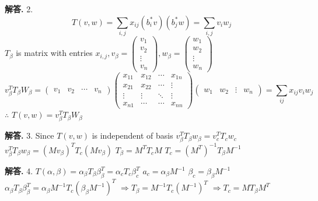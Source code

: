 \documentclass[12pt, a4paper, oneside]{article}
\newenvironment{solution}{\par\noindent\textbf{解答. }}{\par}
\begin{document}
\begin{CJK}{UTF8}{gbsn}
\begin{solution} 2. \newline 
  $$T(v,w) = \sum_{i,j}x_{ij}\left( b^*_iv \right)\left( b^*_j w\right) = \sum_{i,j}v_iw_j$$
  $T_\beta$ is matrix with entries $x_{i,j}, v_\beta=\begin{pmatrix}
    v_1 \\ v_2 \\ \vdots \\ v_n
  \end{pmatrix}, w_\beta = \begin{pmatrix}
    w_1 \\ w_2 \\ \vdots \\ w_n
  \end{pmatrix}$
  $$ v_\beta^T T_\beta W_\beta = \begin{pmatrix}
    v_1 & v_2 & \cdots & v_n
  \end{pmatrix}\begin{pmatrix}
    x_{11} & x_{12} & \cdots & x_{1n} \\
    x_{21} & x_{22} & \cdots & \vdots \\
    \vdots & \vdots & \ddots & \vdots \\
    x_{n1} & \cdots & \cdots & x_{nn}
  \end{pmatrix}\begin{pmatrix}
    w_1 & w_2 & \vdots & w_n
  \end{pmatrix} = \sum_{ij}x_{ij}v_iw_j$$
  $\therefore$ $T(v,w) = v^T_\beta T_\beta W_\beta$
\end{solution}

\begin{solution} 3. \newline
  Since $T(v,w)$ is independent of basis \newline
  $v_\beta^TT_\beta w_\beta = v_c^T T_c w_c$ \newline
  $v_\beta^TT_\beta w_\beta = (Mv_\beta)^TT_c(Mv_\beta)$ \newline
  $T_\beta = M^TT_cM$ \newline
  $T_c = (M^T)^{-1}T_\beta M^{-1}$
\end{solution}

\begin{solution} 4. \newline
  $T(\alpha, \beta) = \alpha_\beta T_\beta \beta_\beta^T = \alpha_cT_c\beta_c^T$ \newline
  $a_c=\alpha_\beta M^{-1}$ \newline
  $\beta_c = \beta_\beta M^{-1}$ \newline 
  $\alpha_\beta T_\beta \beta_\beta^T = \alpha_\beta M^{-1}T_c(\beta_\beta M^{-1})^T$ \newline
  $\Rightarrow T_\beta = M^{-1}T_c(M^{-1})^T$ \newline
  $\Rightarrow T_c = MT_\beta M^T$
\end{solution}


\end{CJK}
\end{document}
